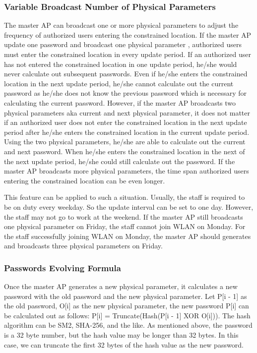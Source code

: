 \subsubsection{Variable Broadcast Number of Physical Parameters} 
The master AP can broadcast one or more physical parameters to adjust the frequency of authorized users entering the constrained location. If the master AP update one password and broadcast one physical parameter , authorized users must enter the constrained location in every update period. If an authorized user has not entered the constrained location in one update period, he/she would never calculate out subsequent passwords. Even if he/she enters the constrained location in the next update period, he/she cannot calculate out the current password as he/she does not know the previous password which is necessary for calculating the current password. However, if the master AP broadcasts two physical parameters aka current and next physical parameter, it does not matter if an authorized user does not enter the constrained location in the next update period after he/she enters the constrained location in the current update period. Using the two physical parameters, he/she are able to calculate out the current and next password. When he/she enters the constrained location in the next of the next update period, he/she could still calculate out the password. If the master AP broadcasts more physical parameters, the time span authorized users entering the constrained location can be even longer. 


This feature can be applied to such a situation. Usually, the staff is required to be on duty every weekday. So the update interval can be set to one day. However, the staff may not go to work at the weekend. If the master AP still broadcasts one physical parameter on Friday, the staff cannot join WLAN on Monday. For the staff successfully joining WLAN on Monday, the master AP should generates and broadcasts three physical parameters on Friday. 

\subsubsection{Passwords Evolving Formula}
Once the master AP generates a new physical parameter, it calculates a new password with the old password and the new physical parameter. Let P[i - 1] as the old password, O[i] as the new physical parameter, the new password P[i] can be calculated out as follows: 
P[i] = Truncate(Hash(P[i - 1] XOR O[i]))\cite{m2005hotp}\cite{Liu2014An}. 
The hash algorithm can be SM2, SHA-256, and the like. As mentioned above, the password is a 32 byte number, but the hash value may be longer than 32 bytes. In this case, we can truncate the first 32 bytes of the hash value as the new password. 



